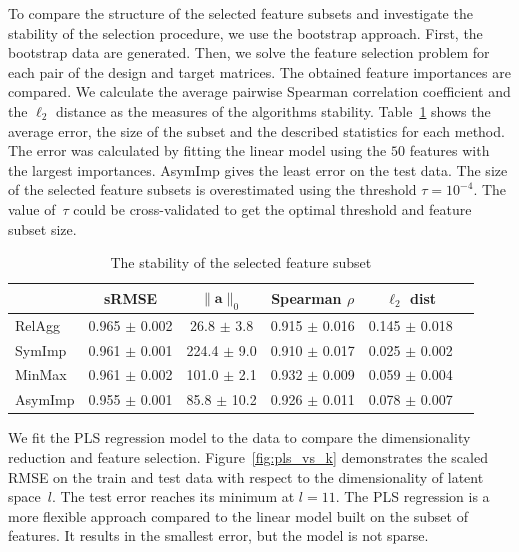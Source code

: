 \documentclass[preprint,authoryear,12pt]{elsarticle}
\theoremstyle{definition}
\newcommand{\ba}{\mathbf{a}}
\begin{document}
To compare the structure of the selected feature subsets and investigate the stability of the selection procedure, we use the bootstrap approach. 
First, the bootstrap data are generated. 
Then, we solve the feature selection problem for each pair of the design and target matrices.
The obtained feature importances are compared. 
We calculate the average pairwise Spearman correlation coefficient and the $\ell_2$ distance as the measures of the algorithms stability.
Table~\ref{tbl:stability} shows the average error, the size of the subset and the described statistics for each method. The error was calculated by fitting the linear model using the $50$ features with the largest importances.
AsymImp gives the least error on the test data. 
The size of the selected feature subsets is overestimated using the threshold $\tau=10^{-4}$. 
The value of~$\tau$ could be cross-validated to get the optimal threshold and feature subset size. 

\begin{table}[]
	\caption{The stability of the selected feature subset}
	\centering
	\begin{tabular}{l|ccccc}
		\hline
		& sRMSE  & $\|\ba\|_0$ & Spearman $\rho$ & $\ell_2$ dist \\ \hline
		RelAgg & 0.965 $\pm$ 0.002 & 26.8 $\pm$ 3.8 & 0.915 $\pm$ 0.016 & 0.145 $\pm$ 0.018   \\
		SymImp & 0.961 $\pm$ 0.001 & 224.4 $\pm$ 9.0 & 0.910 $\pm$ 0.017 & 0.025 $\pm$ 0.002   \\
		MinMax & 0.961 $\pm$ 0.002 & 101.0 $\pm$ 2.1& 0.932 $\pm$ 0.009 & 0.059 $\pm$ 0.004   \\
		AsymImp & 0.955 $\pm$ 0.001 & 85.8 $\pm$ 10.2& 0.926 $\pm$ 0.011 & 0.078 $\pm$ 0.007  \\ \hline
	\end{tabular}
	\label{tbl:stability}
\end{table}

We fit the PLS regression model to the data to compare the dimensionality reduction and feature selection. 
Figure~\ref{fig:pls_vs_k} demonstrates the scaled RMSE on the train and test data with respect to the dimensionality of latent space~$l$.
The test error reaches its minimum at $l = 11$.
The PLS regression is a more flexible approach compared to the linear model built on the subset of features.
It results in the smallest error, but the model is not sparse.
\end{document}
